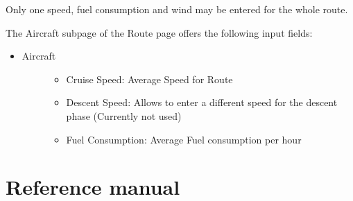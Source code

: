 \documentclass[letterpaper,10pt,english]{sphinxmanual}
\begin{document}
Only one speed, fuel consumption and wind may be entered for the whole route.

The Aircraft sub\sphinxhyphen{}page of the Route page offers the following input fields:
\begin{itemize}
\item {} \begin{description}
\item[{Aircraft}] \leavevmode\begin{itemize}
\item {} 
Cruise Speed: Average Speed for Route

\item {} 
Descent Speed: Allows to enter a different speed for the descent phase (Currently not used)

\item {} 
Fuel Consumption: Average Fuel consumption per hour

\end{itemize}

\end{description}

\end{itemize}

\part{Reference manual}
\end{document}
